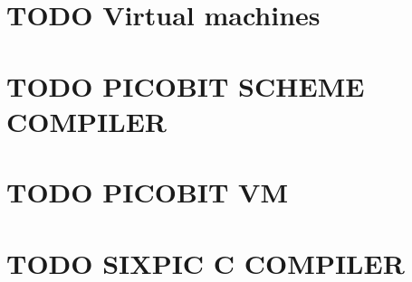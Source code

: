 \documentclass[11pt]{article}
\begin{document}
\section{{\bfseries\sffamily TODO} Virtual machines}
\label{sec-6}

\section{{\bfseries\sffamily TODO} PICOBIT SCHEME COMPILER}
\label{sec-7}

\section{{\bfseries\sffamily TODO} PICOBIT VM}
\label{sec-8}

\section{{\bfseries\sffamily TODO} SIXPIC C COMPILER}
\label{sec-9}
\end{document}
